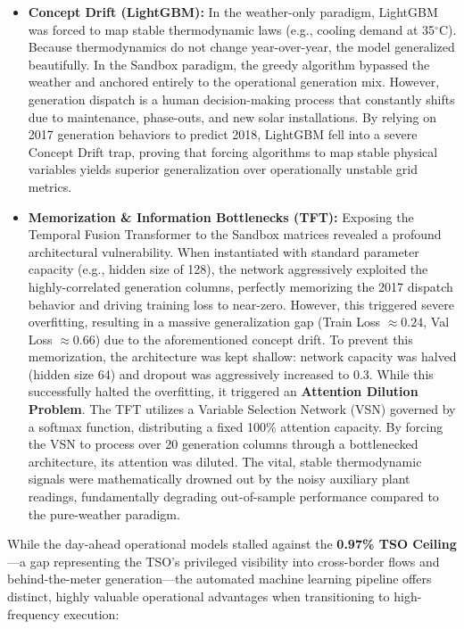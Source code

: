 \documentclass{article}
\begin{document}
\begin{itemize}
    \item \textbf{Concept Drift (LightGBM):} In the weather-only paradigm, LightGBM was forced to map stable thermodynamic laws (e.g., cooling demand at 35$^\circ$C). Because thermodynamics do not change year-over-year, the model generalized beautifully. In the Sandbox paradigm, the greedy algorithm bypassed the weather and anchored entirely to the operational generation mix. However, generation dispatch is a human decision-making process that constantly shifts due to maintenance, phase-outs, and new solar installations. By relying on 2017 generation behaviors to predict 2018, LightGBM fell into a severe Concept Drift trap, proving that forcing algorithms to map stable physical variables yields superior generalization over operationally unstable grid metrics.
    
    \item \textbf{Memorization \& Information Bottlenecks (TFT):} Exposing the Temporal Fusion Transformer to the Sandbox matrices revealed a profound architectural vulnerability. When instantiated with standard parameter capacity (e.g., hidden size of 128), the network aggressively exploited the highly-correlated generation columns, perfectly memorizing the 2017 dispatch behavior and driving training loss to near-zero. However, this triggered severe overfitting, resulting in a massive generalization gap (Train Loss $\approx 0.24$, Val Loss $\approx 0.66$) due to the aforementioned concept drift. To prevent this memorization, the architecture was kept shallow: network capacity was halved (hidden size 64) and dropout was aggressively increased to 0.3. While this successfully halted the overfitting, it triggered an \textbf{Attention Dilution Problem}. The TFT utilizes a Variable Selection Network (VSN) governed by a softmax function, distributing a fixed 100\% attention capacity. By forcing the VSN to process over 20 generation columns through a bottlenecked architecture, its attention was diluted. The vital, stable thermodynamic signals were mathematically drowned out by the noisy auxiliary plant readings, fundamentally degrading out-of-sample performance compared to the pure-weather paradigm.

\end{itemize}

While the day-ahead operational models stalled against the \textbf{0.97\% TSO Ceiling}—a gap representing the TSO's privileged visibility into cross-border flows and behind-the-meter generation—the automated machine learning pipeline offers distinct, highly valuable operational advantages when transitioning to high-frequency execution:
\end{document}
